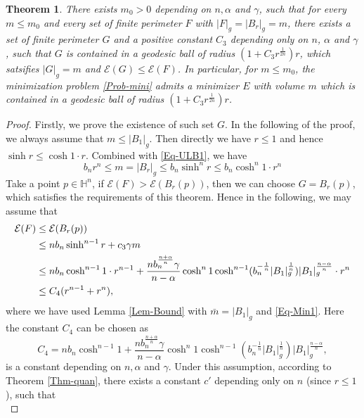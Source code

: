 \documentclass[11pt,reqno]{amsart}
\newtheorem{thm}{Theorem}[section]
\theoremstyle{definition}
\theoremstyle{remark}
\numberwithin{equation}{section}
\renewcommand{\(}{\left(}
\renewcommand{\)}{\right)}
\renewcommand{\-}{\overline}
\begin{document}
\begin{thm}\label{Lem-Min}
	There exists $m_0>0$ depending on $n,\alpha$ and $\gamma$, such that for every $m\leq m_0$ and every set of finite perimeter $F$ with $|F|_g=|B_r|_g=m$, there exists a set of finite perimeter $G$ and a positive constant $C_3$ depending only on $n$, $\alpha$ and $\gamma$, such that $G$ is contained in a geodesic ball of radius $(1+C_3 r^{\frac{1}{2n}})r$, which satsifies $|G|_g=m$ and $\mathcal{E}(G)\leq\mathcal{E}(F)$. In particular, for $m\leq m_0$, the minimization problem \eqref{Prob-mini} admits a minimizer $E$ with volume $m$ which is contained in a geodesic ball of radius $(1+C_3 r^{\frac{1}{2n}})r$.
\end{thm}
\begin{proof}
Firstly, we prove the existence of such set $G$. In the following of the proof, we always assume that $m\leq |B_1|_g$. Then directly we have $r\leq 1$ and hence $\sinh r\leq\cosh 1\cdot r$.  Combined with \eqref{Eq-ULB1}, we have
\begin{equation}\label{Eq-Min1}
	b_n r^n \leq m=|B_r|_g\leq b_n\sinh^n r\leq b_n \cosh^n 1\cdot r^n
\end{equation}
Take a point $p\in\mathbb{H}^n$, if $\mathcal{E}(F)>\mathcal{E}(B_r(p))$, then we can choose  $G=B_r(p)$, which satisfies the requirements of this theorem. Hence in the following, we may assume that
\begin{align}
 \mathcal{E}(F)&\leq\mathcal{E}(B_r(p))\notag\\
 &\leq nb_n\sinh^{n-1} r+c_3\gamma m\notag\\
 &\leq nb_n\cosh^{n-1}1\cdot r^{n-1}+\frac{n b_n^{\frac{n+\alpha}{n}}\gamma}{n-\alpha}\cosh^n 1\cosh^{n-1}(b_n^{-\frac{1}{n}}|B_1|_g^{\frac{1}{n}})|B_1|_g^{\frac{n-\alpha}{n}}\cdot r^n\notag\\
 &\leq C_4(r^{n-1}+r^n), \label{Eq-Min0}
\end{align}
where we have used Lemma \ref{Lem-Bound} with $\bar{m}=|B_1|_g$ and \eqref{Eq-Min1}. Here the constant $C_4$ can be chosen as
\begin{equation}\label{Defn-C_4}
	C_4=nb_n\cosh^{n-1}1+\frac{n b_n^{\frac{n+\alpha}{n}}\gamma}{n-\alpha}\cosh^n 1\cosh^{n-1}(b_n^{-\frac{1}{n}}|B_1|_g^{\frac{1}{n}})|B_1|_g^{\frac{n-\alpha}{n}},
\end{equation}
 is a constant depending on $n,\alpha$ and $\gamma$.
	Under this assumption, according to Theorem \ref{Thm-quan}, there exists a constant $c'$ depending only on $n$ (since $r\leq 1$), such that 
	\begin{equation}\label{Eq-Min2}

\end{equation}
\end{proof}
\end{document}
